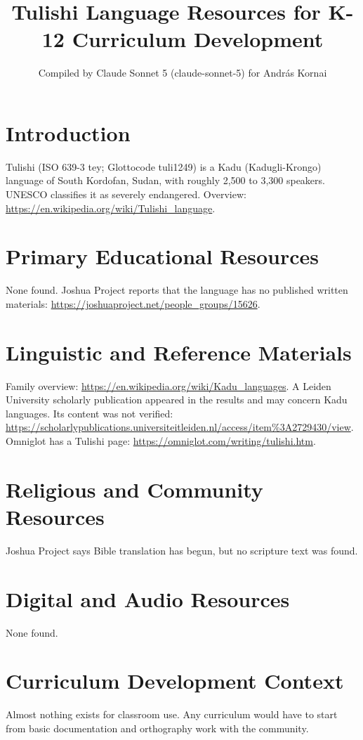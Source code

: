 \documentclass[12pt]{article}
\title{Tulishi Language Resources for K-12 Curriculum Development}
\author{Compiled by Claude Sonnet 5 (claude-sonnet-5) for Andr\'as Kornai}
\date{}
\begin{document}
\maketitle

\section{Introduction}
Tulishi (ISO 639-3 tey; Glottocode tuli1249) is a Kadu (Kadugli-Krongo) language of South Kordofan, Sudan, with roughly 2,500 to 3,300 speakers. UNESCO classifies it as severely endangered. Overview: \url{https://en.wikipedia.org/wiki/Tulishi_language}.

\section{Primary Educational Resources}
None found. Joshua Project reports that the language has no published written materials: \url{https://joshuaproject.net/people_groups/15626}.

\section{Linguistic and Reference Materials}
Family overview: \url{https://en.wikipedia.org/wiki/Kadu_languages}.
A Leiden University scholarly publication appeared in the results and may concern Kadu languages. Its content was not verified: \url{https://scholarlypublications.universiteitleiden.nl/access/item\%3A2729430/view}.
Omniglot has a Tulishi page: \url{https://omniglot.com/writing/tulishi.htm}.

\section{Religious and Community Resources}
Joshua Project says Bible translation has begun, but no scripture text was found.

\section{Digital and Audio Resources}
None found.

\section{Curriculum Development Context}
Almost nothing exists for classroom use. Any curriculum would have to start from basic documentation and orthography work with the community.
\end{document}

